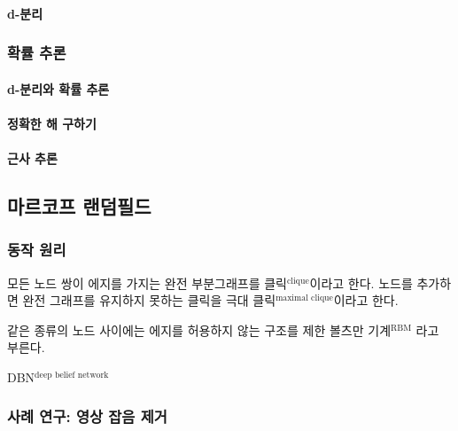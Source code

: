 \documentclass [12pt] {oblivoir}
\let\oldsubsubsection=\subsubsection
\renewcommand{\subsubsection}
{
  \filbreak
  \oldsubsubsection
}
\begin{document}
\paragraph*{d-분리}\mbox{}

\vspace{3mm}

\subsubsection{확률 추론}

\paragraph*{d-분리와 확률 추론}\mbox{}

\vspace{3mm}

\paragraph*{정확한 해 구하기}\mbox{}

\vspace{3mm}

\paragraph*{근사 추론}\mbox{}

\vspace{3mm}

\subsection{마르코프 랜덤필드}

\subsubsection{동작 원리}

모든 노드 쌍이 에지를 가지는 완전 부분그래프를 클릭$^{\text{clique}}$이라고 한다. 노드를 추가하면 완전 그래프를 유지하지 못하는 클릭을 극대 클릭$^{\text{maximal clique}}$이라고 한다.

\vspace{3mm}
같은 종류의 노드 사이에는 에지를 허용하지 않는 구조를 제한 볼츠만 기계$^{\text{RBM}}$ 라고 부른다.

DBN$^\text{deep belief network}$

\subsubsection{사례 연구: 영상 잡음 제거}
\end{document}
